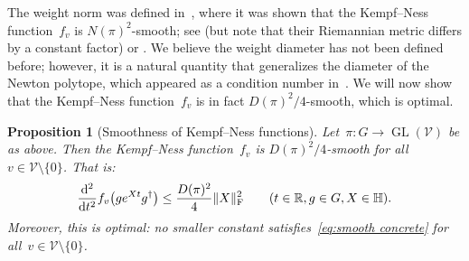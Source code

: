 \documentclass[11pt,letterpaper]{article}
\newtheorem{proposition}[theorem]{Proposition}\AddToHook{env/proposition/begin}{\crefalias{theorem}{proposition}}\crefname{proposition}{Proposition}{Propositions}
\numberwithin{equation}{section}
\newcommand{\RR}{\mathbb{R}}
\newcommand{\bbH}{\mathbb{H}}
\newcommand{\diff}{\mathrm{d}}
\newcommand{\VV}{\mathcal{V}}
\DeclareMathOperator{\GL}{GL}
\DeclarePairedDelimiter\norm{\lVert}{\rVert}
\begin{document}
The weight norm was defined in~\cite{BFGOWW2019}, where it was shown that the Kempf--Ness function~$f_v$ is $N(\pi)^2$-smooth; see \cite[Prop.~3.13]{BFGOWW2019} (but note that their Riemannian metric differs by a constant factor) or \cite[Lem.~4.2~(1)]{HiraiSakabe2024}.
We believe the weight diameter has not been defined before; however, it is a natural quantity that generalizes the diameter of the Newton polytope, which appeared as a condition number in~\cite{BLNW2020}.
We will now show that the Kempf--Ness function~$f_v$ is in fact $D(\pi)^2/4$-smooth, which is optimal.

\begin{proposition}[Smoothness of Kempf--Ness functions]\label{prop:kn-smooth}
Let~$\pi \colon G \to \GL(\VV)$ be as above.
Then the Kempf--Ness function~$f_v$ is $D(\pi)^2/4$-smooth for all~$v \in \VV\setminus\{0\}$.
That is:
\begin{equation}\label{eq:smooth concrete}
    \frac{\diff^2}{\diff t^2} f_v\mleft(g e^{Xt} g^\dagger\mright) \leq \frac{D(\pi)^2}4 \norm{X}_{\mathrm F}^2 \qquad (t \in \RR, g \in G, X \in \bbH).
\end{equation}
Moreover, this is optimal: no smaller constant satisfies~\eqref{eq:smooth concrete} for all~$v \in \VV\setminus\{0\}$.
\end{proposition}
\end{document}
